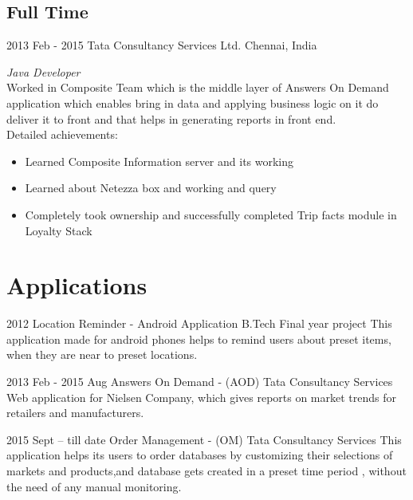 \documentclass[]{lalet-cv}
\begin{document}
\subsection{Full Time}

\begin{entrylist}


\entry
{2013 Feb - 2015 \enspace}
{Tata Consultancy Services Ltd.}
{Chennai, India}
{\emph{Java Developer} \\
Worked in Composite Team which is the middle layer of Answers On Demand application which enables bring in
data and applying business logic on it do deliver it to front and that helps in generating reports in
front end. \\
Detailed achievements:
\begin{itemize}
\item Learned Composite Information server and its working
\item Learned about Netezza box and working and query 
\item Completely took ownership and successfully completed Trip facts module in Loyalty Stack
\end{itemize}}


\end{entrylist}

\section{Applications}

\begin{entrylist}
  \entry
  {2012}
  {Location Reminder - Android Application}
  {B.Tech Final year project}
  {This application made for android phones helps to remind users about preset items, 
  when they are near to preset locations.}  

  \entry
  {2013 Feb - 2015 Aug \enspace}
  {Answers On Demand - (AOD)}
  {Tata Consultancy Services}
  {Web application for Nielsen Company, which gives reports on market trends for 
  retailers and manufacturers.}  

  \entry
  {2015 Sept -- till date \enspace}
  {Order Management - (OM)}
  {Tata Consultancy Services}
  {This application helps its users to order databases by customizing their selections 
  of markets and products,and database gets created in a preset time period , without 
  the need of any manual monitoring.}   
   
\end{entrylist}
\pagebreak
\end{document}
